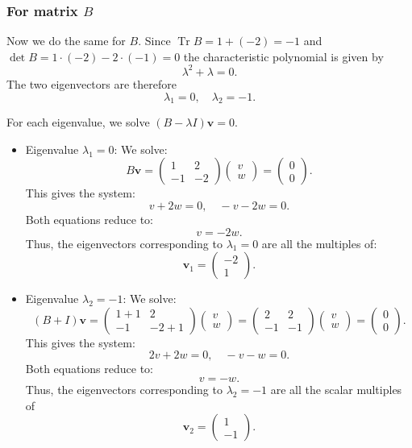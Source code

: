 \documentclass[addpoints, 12pt,answers]{exam}
\begin{document}
\begin{questions}
\begin{solution}
\subsubsection*{For matrix $B$}
Now we do the same for $B$.
Since $\operatorname{Tr} B = 1 + (-2) = -1$ and $\det B = 1 \cdot (-2) - 2 \cdot (-1) = 0$
the characteristic polynomial is given by
\[ \lambda^2 + \lambda = 0. \]
The two eigenvectors are therefore
\[ \lambda_1 = 0, \quad \lambda_2 = -1. \]

For each eigenvalue, we solve $(B - \lambda I)\mathbf{v} = 0$.
\begin{itemize}
\item {Eigenvalue $\lambda_1 = 0$:}
We solve:
\[ B \mathbf{v} = \begin{pmatrix} 1 & 2 \\ -1 & -2 \end{pmatrix} \begin{pmatrix} v \\ w \end{pmatrix} = \begin{pmatrix} 0 \\ 0 \end{pmatrix}. \]
This gives the system:
\[ v + 2w = 0, \quad -v - 2w = 0. \]
Both equations reduce to:
\[ v = -2w. \]
Thus, the eigenvectors corresponding to $\lambda_1 = 0$ are all the multiples of:
\[ \mathbf{v}_1 = \begin{pmatrix} -2 \\ 1 \end{pmatrix}. \]

\item {Eigenvalue $\lambda_2 = -1$:}
We solve:
\[ (B + I) \mathbf{v} = \begin{pmatrix} 1 + 1 & 2 \\ -1 & -2 + 1 \end{pmatrix} \begin{pmatrix} v \\ w \end{pmatrix} = \begin{pmatrix} 2 & 2 \\ -1 & -1 \end{pmatrix} \begin{pmatrix} v \\ w \end{pmatrix} = \begin{pmatrix} 0 \\ 0 \end{pmatrix}. \]
This gives the system:
\[ 2v + 2w = 0, \quad -v - w = 0. \]
Both equations reduce to:
\[ v = -w. \]
Thus, the eigenvectors corresponding to $\lambda_2 = -1$ are all the scalar multiples of
\[ \mathbf{v}_2 = \begin{pmatrix} 1 \\ -1 \end{pmatrix}. \]
\end{itemize}
\end{solution}


\end{questions}
\end{document}
